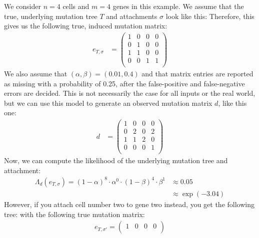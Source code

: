 \begin{example}
    \label{exmpl:scite_problem}
    We consider $n = 4$ cells and $m = 4$ genes in this example. We assume that the true, underlying mutation tree $T$ and attachments $\sigma$ look like this:
    Therefore, this gives us the following true, induced mutation matrix:
    \begin{align*}
        e_{T, \sigma} &= \begin{pmatrix}
            1 & 0 & 0 & 0 \\
            0 & 1 & 0 & 0 \\
            1 & 1 & 0 & 0 \\
            0 & 0 & 1 & 1 \\
        \end{pmatrix}
    \end{align*}
    We also assume that $(\alpha, \beta) = (0.01, 0.4)$ and that matrix entries are reported as missing with a probability of 0.25, after the false-positive and false-negative errors are decided. This is not necessarily the case for all inputs or the real world, but we can use this model to generate an observed mutation matrix $d$, like this one:
    \begin{align*}
        d &= \begin{pmatrix}
            1 & 0 & 0 & 0 \\
            0 & 2 & 0 & 2 \\
            1 & 1 & 2 & 0 \\
            0 & 0 & 0 & 1 \\
        \end{pmatrix}
    \end{align*}
    Now, we can compute the likelihood of the underlying mutation tree and attachment:
    \begin{align*}
        \Lambda_d(e_{T, \sigma}) = (1-\alpha)^{8} \cdot \alpha^{0} \cdot (1-\beta)^{4} \cdot \beta^{1} &\approx 0.05 \\
        &\approx \exp(-3.04)
    \end{align*}
    However, if you attach cell number two to gene two instead, you get the following tree:
    with the following true mutation matrix:
    \begin{align*}
        e_{T, \sigma'} = \begin{pmatrix}
            1 & 0 & 0 & 0 \\

\end{pmatrix}
\end{align*}
\end{example}
